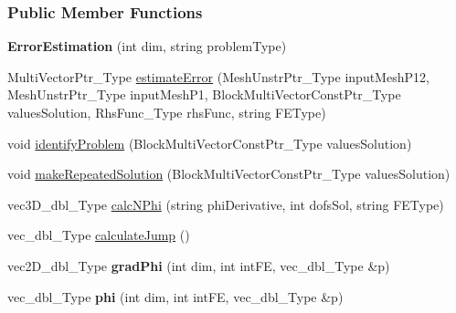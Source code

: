 \subsubsection*{Public Member Functions}
\begin{DoxyCompactItemize}
\item 
\mbox{\label{classFEDD_1_1ErrorEstimation_a698c24c8cd36f36af834b60243610ead}} 
{\bfseries Error\+Estimation} (int dim, string problem\+Type)
\item 
Multi\+Vector\+Ptr\+\_\+\+Type \hyperlink{classFEDD_1_1ErrorEstimation_a6c47ea56ff04e636185795def03e96ab}{estimate\+Error} (Mesh\+Unstr\+Ptr\+\_\+\+Type input\+Mesh\+P12, Mesh\+Unstr\+Ptr\+\_\+\+Type input\+Mesh\+P1, Block\+Multi\+Vector\+Const\+Ptr\+\_\+\+Type values\+Solution, Rhs\+Func\+\_\+\+Type rhs\+Func, string F\+E\+Type)
\item 
\mbox{\label{classFEDD_1_1ErrorEstimation_ae1249c5ae853284c90a95a6ed7e1ae76}} 
void \hyperlink{classFEDD_1_1ErrorEstimation_ae1249c5ae853284c90a95a6ed7e1ae76}{identify\+Problem} (Block\+Multi\+Vector\+Const\+Ptr\+\_\+\+Type values\+Solution)
\item 
\mbox{\label{classFEDD_1_1ErrorEstimation_a3caa783b52c487cf876abd51d878c8d8}} 
void \hyperlink{classFEDD_1_1ErrorEstimation_a3caa783b52c487cf876abd51d878c8d8}{make\+Repeated\+Solution} (Block\+Multi\+Vector\+Const\+Ptr\+\_\+\+Type values\+Solution)
\item 
vec3\+D\+\_\+dbl\+\_\+\+Type \hyperlink{classFEDD_1_1ErrorEstimation_a9ae32182704da33b589b06b2a1816f2b}{calc\+N\+Phi} (string phi\+Derivative, int dofs\+Sol, string F\+E\+Type)
\item 
vec\+\_\+dbl\+\_\+\+Type \hyperlink{classFEDD_1_1ErrorEstimation_a18592a9cd648b84e439226947017c4e8}{calculate\+Jump} ()
\item 
\mbox{\label{classFEDD_1_1ErrorEstimation_af4cbf1f8a220743cbadca95b37075144}} 
vec2\+D\+\_\+dbl\+\_\+\+Type {\bfseries grad\+Phi} (int dim, int int\+FE, vec\+\_\+dbl\+\_\+\+Type \&p)
\item 
\mbox{\label{classFEDD_1_1ErrorEstimation_a9c030689210f99a2f0cf4db112bdf3b7}} 
vec\+\_\+dbl\+\_\+\+Type {\bfseries phi} (int dim, int int\+FE, vec\+\_\+dbl\+\_\+\+Type \&p)

\end{DoxyCompactItemize}
